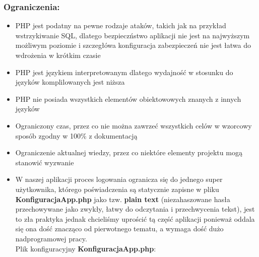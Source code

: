 \subsubsection{Ograniczenia:}
    \begin{itemize}
        \item PHP jest podatny na pewne rodzaje ataków, takich jak na przykład wstrzykiwanie SQL, dlatego bezpieczństwo aplikacji nie jest na najwyższym możliwym poziomie i szczegłówa konfiguracja zabezpieczeń nie jest łatwa do wdrożenia w krótkim czasie
        \item PHP jest językiem interpretowanym dlatego wydajność w stosunku do języków komplilowanych jest niższa
        \item PHP nie posiada wszystkich elementów obiektowowych znanych z innych języków
        \item Ograniczony czas, przez co nie można zawrzeć wszystkich celów w wzorcowy sposób zgodny w 100\% z dokumentacją
        \item Ograniczenie aktualnej wiedzy, przez co niektóre elementy projektu mogą stanowić wyzwanie
        \item W naszej aplikacji proces logowania ogranicza się do jednego super użytkownika, którego poświadczenia są statycznie zapisne w pliku \textbf{KonfiguracjaApp.php} jako tzw. \textbf{plain text} (niezahaszowane hasła przechowywane jako zwykły, łatwy do odczytania i przechwycenia tekst), jest to zła praktyka jednak chcieliśmy uprościć tą część aplikacji ponieważ oddala się ona dość znacząco od pierwotnego tematu, a wymaga dość dużo nadprogramowej pracy.\\
        Plik konfiguracyjny \textbf{KonfiguracjaApp.php}:
         
        
    \end{itemize}

\pagebreak

